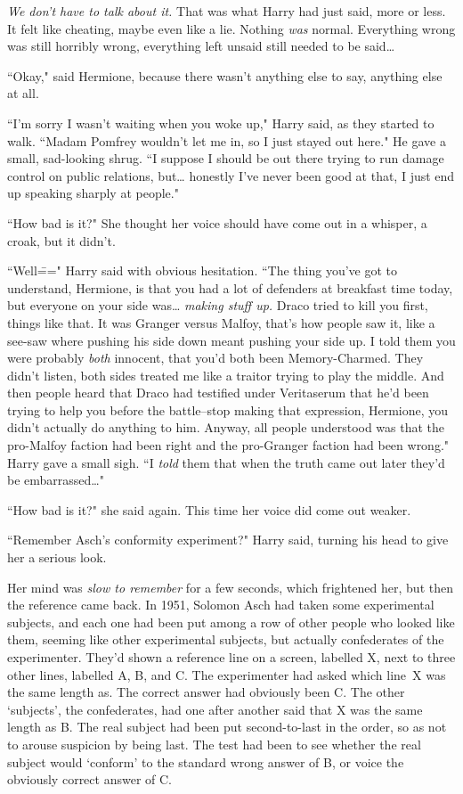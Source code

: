 \emph{We don't have to talk about it.} That was what Harry had just said, more or less. It felt like cheating, maybe even like a lie. Nothing \emph{was} normal. Everything wrong was still horribly wrong, everything left unsaid still needed to be said{\ldots}

``Okay," said Hermione, because there wasn't anything else to say, anything else at all.

``I'm sorry I wasn't waiting when you woke up," Harry said, as they started to walk. ``Madam Pomfrey wouldn't let me in, so I just stayed out here." He gave a small, sad-looking shrug. ``I suppose I should be out there trying to run damage control on public relations, but{\ldots} honestly I've never been good at that, I just end up speaking sharply at people."

``How bad is it?" She thought her voice should have come out in a whisper, a croak, but it didn't.

``Well\===" Harry said with obvious hesitation. ``The thing you've got to understand, Hermione, is that you had a lot of defenders at breakfast time today, but everyone on your side was{\ldots} \emph{making stuff up.} Draco tried to kill you first, things like that. It was Granger versus Malfoy, that's how people saw it, like a see-saw where pushing his side down meant pushing your side up. I told them you were probably \emph{both} innocent, that you'd both been Memory-Charmed. They didn't listen, both sides treated me like a traitor trying to play the middle. And then people heard that Draco had testified under Veritaserum that he'd been trying to help you before the battle\---stop making that expression, Hermione, you didn't actually do anything to him. Anyway, all people understood was that the pro-Malfoy faction had been right and the pro-Granger faction had been wrong." Harry gave a small sigh. ``I \emph{told} them that when the truth came out later they'd be embarrassed{\ldots}"

``How bad is it?" she said again. This time her voice did come out weaker.

``Remember Asch's conformity experiment?" Harry said, turning his head to give her a serious look.

Her mind was \emph{slow to remember} for a few seconds, which frightened her, but then the reference came back. In 1951, Solomon Asch had taken some experimental subjects, and each one had been put among a row of other people who looked like them, seeming like other experimental subjects, but actually confederates of the experimenter. They'd shown a reference line on a screen, labelled X, next to three other lines, labelled A, B, and C\@. The experimenter had asked which line~X was the same length as. The correct answer had obviously been C\@. The other `subjects', the confederates, had one after another said that X was the same length as B\@. The real subject had been put second-to-last in the order, so as not to arouse suspicion by being last. The test had been to see whether the real subject would `conform' to the standard wrong answer of B, or voice the obviously correct answer of C\@.


